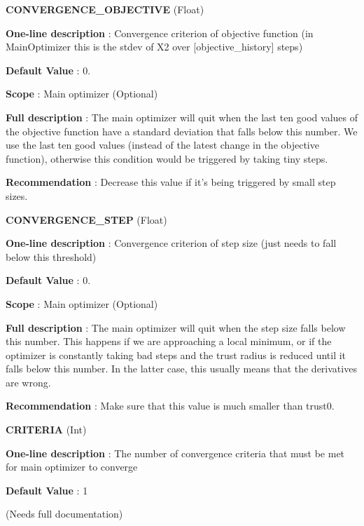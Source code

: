 \begin{DoxyItemize}
\item {\bfseries  C\-O\-N\-V\-E\-R\-G\-E\-N\-C\-E\-\_\-\-O\-B\-J\-E\-C\-T\-I\-V\-E } (Float) \par
{\bfseries  One-\/line description }\-: Convergence criterion of objective function (in Main\-Optimizer this is the stdev of X2 over \mbox{[}objective\-\_\-history\mbox{]} steps) \par
{\bfseries  Default Value }\-: 0. \par
{\bfseries  Scope }\-: Main optimizer (Optional) \par
{\bfseries  Full description }\-: The main optimizer will quit when the last ten good values of the objective function have a standard deviation that falls below this number. We use the last ten good values (instead of the latest change in the objective function), otherwise this condition would be triggered by taking tiny steps. \par
{\bfseries  Recommendation }\-: Decrease this value if it's being triggered by small step sizes.\end{DoxyItemize}
\begin{DoxyItemize}
\item {\bfseries  C\-O\-N\-V\-E\-R\-G\-E\-N\-C\-E\-\_\-\-S\-T\-E\-P } (Float) \par
{\bfseries  One-\/line description }\-: Convergence criterion of step size (just needs to fall below this threshold) \par
{\bfseries  Default Value }\-: 0. \par
{\bfseries  Scope }\-: Main optimizer (Optional) \par
{\bfseries  Full description }\-: The main optimizer will quit when the step size falls below this number. This happens if we are approaching a local minimum, or if the optimizer is constantly taking bad steps and the trust radius is reduced until it falls below this number. In the latter case, this usually means that the derivatives are wrong. \par
{\bfseries  Recommendation }\-: Make sure that this value is much smaller than trust0.\end{DoxyItemize}
\begin{DoxyItemize}
\item {\bfseries  C\-R\-I\-T\-E\-R\-I\-A } (Int) \par
{\bfseries  One-\/line description }\-: The number of convergence criteria that must be met for main optimizer to converge \par
{\bfseries  Default Value }\-: 1 \par
(Needs full documentation)\end{DoxyItemize}
